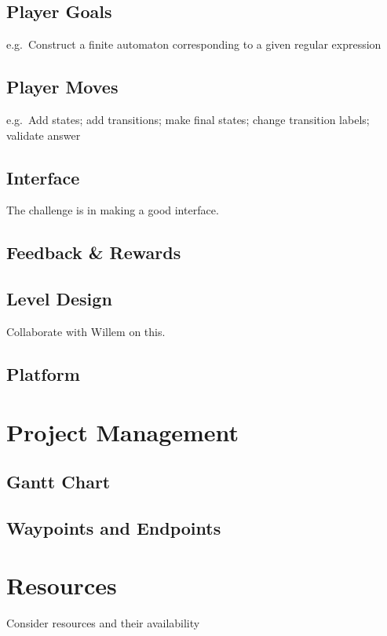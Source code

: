 \documentclass[a4paper]{article}
\begin{document}
\subsection{Player Goals}
e.g.\ Construct a finite automaton corresponding to a given regular expression

\subsection{Player Moves}
e.g.\ Add states; add transitions; make final states; change transition labels; validate answer

\subsection{Interface}
The challenge is in making a good interface.

\subsection{Feedback \& Rewards}

\subsection{Level Design}
Collaborate with Willem on this.

\subsection{Platform}


\section{Project Management} %
\subsection{Gantt Chart}
\subsection{Waypoints and Endpoints}

\section{Resources} %
Consider resources and their availability

\newpage
\printbibliography
\end{document}
